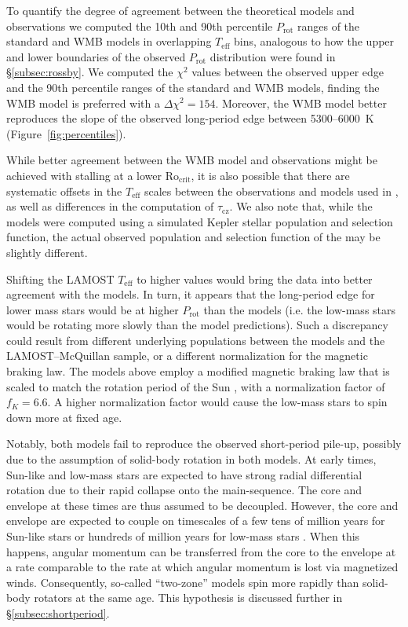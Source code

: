 \documentclass[trackchanges,twocolumn]{aastex631}
\newcommand{\taucz}{$\tau_\mathrm{cz}$\xspace}
\newcommand{\rocrit}{$\mathrm{Ro_{crit}}$\xspace}
\newcommand{\lamostmcq}{LAMOST--McQuillan\xspace}
\newcommand{\teff}{\ensuremath{T_{\mathrm{eff}}}\xspace}
\newcommand{\prot}{\ensuremath{P_\mathrm{rot}}\xspace}
\begin{document}
To quantify the degree of agreement between the theoretical models and observations we computed the 10th and 90th percentile \prot ranges of the standard and WMB models in overlapping \teff bins, analogous to how the upper and lower boundaries of the observed \prot distribution were found in \S\ref{subsec:rossby}. We computed the $\chi^2$ values between the observed upper edge and the 90th percentile ranges of the standard and WMB models, finding the WMB model is preferred with a $\Delta \chi^2 = 154$. Moreover, the WMB model better reproduces the slope of the observed long-period edge between 5300--6000~K (Figure~\ref{fig:percentiles}). 

While better agreement between the WMB model and observations might be achieved with stalling at a lower \rocrit, it is also possible that there are systematic offsets in the \teff scales between the observations and models used in \citet{vanSaders2019}, as well as differences in the computation of \taucz.  We also note that, while the models were computed using a simulated Kepler stellar population and selection function, the actual observed population and selection function of the \edit1{\lamostmcq} may be slightly different. 

Shifting the LAMOST \teff to higher values would bring the data into better agreement with the models. In turn, it appears that the long-period edge for lower mass stars would be at higher \prot than the models (i.e. the low-mass stars would be rotating more slowly than the model predictions). Such a discrepancy could result from different underlying populations between the models and the \lamostmcq sample, or a different normalization for the magnetic braking law. The models above employ a modified magnetic braking law that is scaled to match the rotation period of the Sun \citep[see equations 1 \& 2 of][]{vanSaders2013}, with a normalization factor of $f_K = 6.6$. A higher normalization factor would cause the low-mass stars to spin down more at fixed age.

Notably, both models fail to reproduce the observed short-period pile-up, possibly due to the assumption of solid-body rotation in both models. At early times, Sun-like and low-mass stars are expected to have strong radial differential rotation due to their rapid collapse onto the main-sequence. The core and envelope at these times are thus assumed to be decoupled. However, the core and envelope are expected to couple on timescales of a few tens of million years for Sun-like stars \citep{Denissenkov2010, GalletBouvier2015, Lanzafame2015} or hundreds of million years for low-mass stars \citep{GalletBouvier2015,Lanzafame2015,Somers2016}. When this happens, angular momentum can be transferred from the core to the envelope at a rate comparable to the rate at which angular momentum is lost via magnetized winds. Consequently, so-called ``two-zone'' models \citep{MacGregor1991} spin more rapidly than solid-body rotators at the same age. This hypothesis is discussed further in \S\ref{subsec:shortperiod}.
\end{document}
